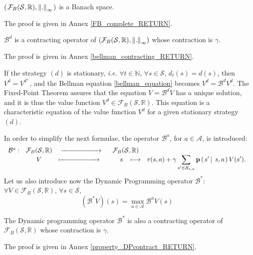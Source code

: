\begin{theorem}
\label{FB_complete}
$\left( \left. \mathcal{F}_{B}(\mathcal{S},\mathbb{R}),\left\lVert . \right\rVert_{\infty}  \right. \right)$ is a Banach space.
\end{theorem}
The proof is given in Annex \ref{FB_complete_RETURN}.

\begin{Property}
\label{bellman_contracting}
$\mathcal{B}^d$ is a contracting operator of $(\mathcal{F}_{B}(\mathcal{S},\mathbb{R}), \left\lVert . \right\rVert_{\infty})$ 
whose contraction is $\gamma$.
\end{Property}
The proof is given in Annex \ref{bellman_contracting_RETURN}.

If the strategy $(d)$ is stationary,
\textit{i.e.} $\forall t \in \mathbb{N}$,
$\forall s \in \mathcal{S}$, 
$d_t(s) = d(s)$, then
$V^d = V^{d^+}$, and the Bellman equation \ref{bellman_equation}
becomes $V^d = \mathcal{B}^d V^d$.
The Fixed-Point Theorem assures that the
equation $V = \mathcal{B}^d V$ has a unique solution, 
and it is thus the value function 
$V^d \in \mathcal{F}_{B} (\mathcal{S},\mathbb{R})$. 
This equation is a characteristic equation 
of the value function $V^d$
for a given stationary strategy $(d)$. 

In order to simplify the next formulae,
the operator $\mathcal{B}^a$,
for $a \in \mathcal{A}$, is introduced:
\[ \left. \begin{array}{ccccc}
 \mathcal{B}^a: & \mathcal{F}_{B}(\mathcal{S},\mathbb{R}) & \xrightarrow{\hspace*{2cm}} \hspace{0.5cm} \mathcal{F}_{B}(\mathcal{S},\mathbb{R}) & \\
& V & \xmapsto{\hspace*{2cm}} \hspace{1cm}  s \hspace{0.3cm} \longmapsto & \displaystyle r(s,a) + \gamma \sum_{s' \in \mathcal{S}_{s,a}} \textbf{p} \left( \left. s' \, \right| \left. \, s,a \right. \right)  V(s'). \end{array} \right.  \]
Let us also introduce now the Dynamic Programming operator 
$\mathcal{B}^*$: $\forall V \in \mathcal{F}_{B}(\mathcal{S},\mathbb{R})$, $\forall s \in \mathcal{S}$,
\[ (\mathcal{B}^* V)(s) = \max_{a \in \mathcal{A}} \mathcal{B}^a V (s) \]

\begin{Property}
\label{property_DPcontract}
The Dynamic programming operator $\mathcal{B}^*$ 
is also a contracting operator of 
$\mathcal{F}_{B} (\mathcal{S},\mathbb{R})$ whose contraction is $\gamma$.
\end{Property}
The proof is given in Annex \ref{property_DPcontract_RETURN}.

